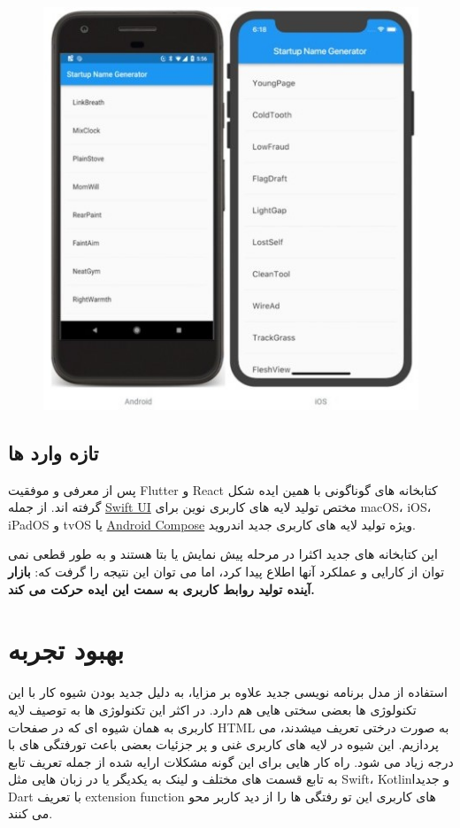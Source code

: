 \documentclass{CSICC2020}
\begin{document}
\begin{figure}[h!]
\centering\includegraphics[width=\linewidth]{Images/flutter}
\caption{}
\label{fig:Flutter}
\end{figure}


\subsection{تازه وارد ها}
پس از معرفی و موفقیت Flutter و React کتابخانه های گوناگونی با همین ایده شکل گرفته اند. از جمله
\href{}{Swift UI}
مختص تولید لایه های کاربری نوین برای macOS، iOS، iPadOS و tvOS یا
\href{}{Android Compose}
ویژه تولید لایه های کاربری جدید اندروید.

این کتابخانه های جدید اکثرا در مرحله پیش نمایش یا بتا هستند و به طور قطعی نمی توان از کارایی و عملکرد آنها اطلاع پیدا کرد، اما می توان این نتیجه را گرفت که: {\bf    بازار آینده تولید روابط کاربری به سمت این ایده حرکت می کند.}

\section{بهبود تجربه}
استفاده از مدل برنامه نویسی جدید علاوه بر مزایا، به دلیل جدید بودن 
شیوه کار با این تکنولوژی ها بعضی سختی هایی هم دارد. 
در اکثر این تکنولوژی ها به توصیف لایه کاربری به همان شیوه ای که در صفحات HTML به صورت درختی تعریف میشدند، می پردازیم.
این شیوه در لایه های کاربری غنی و پر جزئیات بعضی باعث تورفتگی های با درجه زیاد می شود.
راه کار هایی برای این گونه مشکلات ارایه شده از جمله تعریف تابع به تابع قسمت های مختلف و لینک به یکدیگر یا در زبان هایی مثل Swift، Kotlinو جدیدا Dart با تعریف extension function های کاربری این تو رفتگی ها را از دید کاربر محو می کنند.
\end{document}
